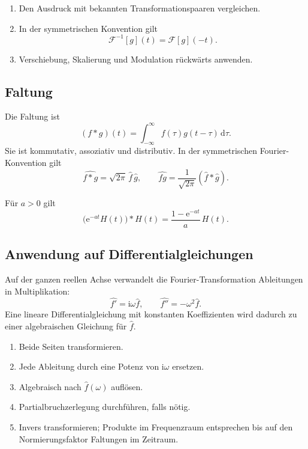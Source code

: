 \documentclass[11pt,a4paper]{article}
\newcommand{\ii}{\mathrm i}
\newcommand{\ee}{\mathrm e}
\newcommand{\dd}{\,\mathrm d}
\newcommand{\1}{\mathbf 1}
\begin{document}
{\begin{kochrezeptbox}[title=Inverse Fourier-Transformation]
\begin{enumerate}
\item Den Ausdruck mit bekannten Transformationspaaren vergleichen.
\item In der symmetrischen Konvention gilt
\[
\mathcal F^{-1}[g](t)=\mathcal F[g](-t).
\]
\item Verschiebung, Skalierung und Modulation rückwärts anwenden.
\end{enumerate}
\end{kochrezeptbox}

\subsection{Faltung}
Die Faltung ist
\[
(f*g)(t)=\int_{-\infty}^{\infty}f(\tau)g(t-\tau)\dd\tau.
\]
Sie ist kommutativ, assoziativ und distributiv. In der symmetrischen
Fourier-Konvention gilt
\[
\widehat{f*g}=\sqrt{2\pi}\,\widehat f\,\widehat g,
\qquad
\widehat{fg}=\frac1{\sqrt{2\pi}}(\widehat f*\widehat g).
\]

\begin{satzbox}[title=Allgemeiner Fall: Faltung mit der Heaviside-Funktion]
Für $a>0$ gilt
\[
\boxed{
\bigl(\ee^{-at}H(t)\bigr)*H(t)
=\frac{1-\ee^{-at}}{a}\,H(t).
}
\]
\end{satzbox}

\subsection{Anwendung auf Differentialgleichungen}
Auf der ganzen reellen Achse verwandelt die Fourier-Transformation Ableitungen in
Multiplikation:
\[
\widehat{f'}=\ii\omega\widehat f,\qquad
\widehat{f''}=-\omega^2\widehat f.
\]
Eine lineare Differentialgleichung mit konstanten Koeffizienten wird dadurch zu
einer algebraischen Gleichung für $\widehat f$.

\begin{kochrezeptbox}[title=Differentialgleichung mit Fourier lösen]
\begin{enumerate}
\item Beide Seiten transformieren.
\item Jede Ableitung durch eine Potenz von $\ii\omega$ ersetzen.
\item Algebraisch nach $\widehat f(\omega)$ auflösen.
\item Partialbruchzerlegung durchführen, falls nötig.
\item Invers transformieren; Produkte im Frequenzraum entsprechen bis auf den
Normierungsfaktor Faltungen im Zeitraum.
\end{enumerate}
\end{kochrezeptbox}

}
\end{document}
